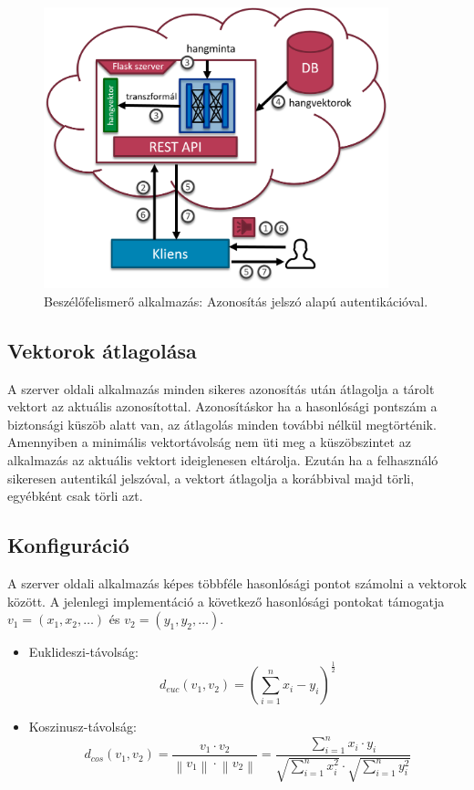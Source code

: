 \begin{figure}[!ht]
	\centering
	\includegraphics[width=100mm, keepaspectratio]{figures/app-with-security.png}
	\caption{Beszélőfelismerő alkalmazás: Azonosítás jelszó alapú autentikációval.}
	\label{fig:app-with-security}
\end{figure}

\subsection{Vektorok átlagolása}

A szerver oldali alkalmazás minden sikeres azonosítás után átlagolja a tárolt vektort az aktuális azonosítottal. Azonosításkor ha a hasonlósági pontszám
a biztonsági küszöb alatt van, az átlagolás minden további nélkül megtörténik.
Amennyiben a minimális vektortávolság nem üti meg a küszöbszintet az alkalmazás az aktuális vektort ideiglenesen eltárolja. Ezután ha a felhasználó sikeresen autentikál jelszóval, a vektort átlagolja a korábbival majd törli, egyébként csak törli azt.


\subsection{Konfiguráció}

A szerver oldali alkalmazás képes többféle hasonlósági pontot számolni
a vektorok között. A jelenlegi implementáció a következő hasonlósági pontokat támogatja $v_1=(x_1, x_2, \dots)$ és $v_2=(y_1, y_2, \dots)$.

\begin{itemize}
	\item Euklideszi-távolság: $$d_{euc}(v_1, v_2) = \left (\sum_{i=1}^{n} x_i - y_i \right) ^\frac{1}{2}$$
	\item Koszinusz-távolság: $$d_{cos}(v_1, v_2) = \frac{v_1 \cdot v_2}{\left\lVert v_1 \right\rVert \cdot \left\lVert v_2 \right\rVert} = \frac{\sum_{i=1}^{n} x_i \cdot y_i}{\sqrt{\sum_{i=1}^{n} x_i^2} \cdot \sqrt{\sum_{i=1}^{n} y_i^2}}$$
\end{itemize}

